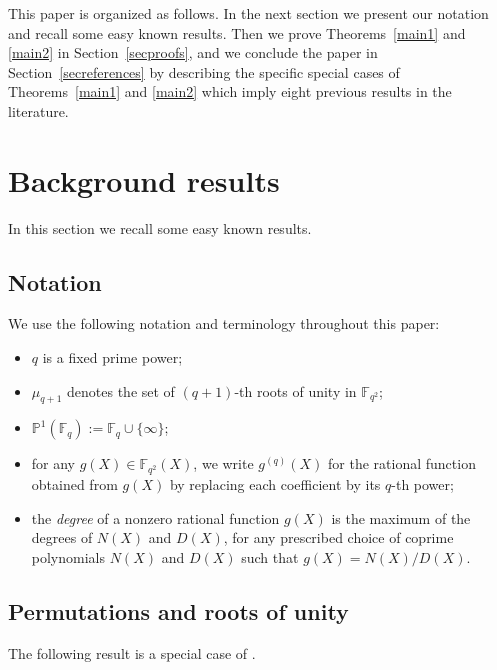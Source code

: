 \documentclass[11pt]{amsart}
\numberwithin{equation}{section}
\theoremstyle{definition}
\newcommand{\F}{\mathbb{F}}
\newcommand{\bP}{\mathbb{P}}
\begin{document}
This paper is organized as follows.  In the next section we present our notation and recall some easy known results.  Then we prove Theorems~\ref{main1} and \ref{main2} in Section~\ref{secproofs}, and we conclude the paper in Section~\ref{secreferences} by describing the specific special cases of Theorems~\ref{main1} and \ref{main2} which imply eight previous results in the literature.




\section{Background results}

In this section we recall some easy known results. 


\subsection{Notation}

We use the following notation and terminology 
throughout this paper:
\begin{itemize}
\item $q$ is a fixed prime power;
\item $\mu_{q+1}$ denotes the set of $(q+1)$-th roots of unity in $\F_{q^2}$;
\item $\bP^1(\F_q) := \F_q\cup\{\infty\}$;
\item for any $g(X)\in\F_{q^2}(X)$, we write $g^{(q)}(X)$ for the rational function obtained from $g(X)$ by replacing 
each coefficient by its $q$-th power;
\item the \emph{degree} of a nonzero rational function $g(X)$ is the maximum of the degrees of $N(X)$ and $D(X)$, 
for any prescribed choice of coprime polynomials $N(X)$ and $D(X)$ such that $g(X)=N(X)/D(X)$.
\end{itemize}


\subsection{Permutations and roots of unity}

The following result is a special case of \cite[Lemma~2.1]{Zlem}.
\end{document}
